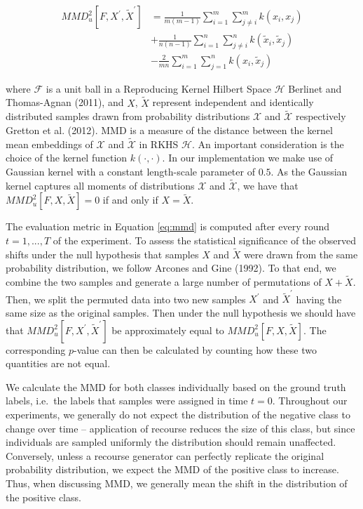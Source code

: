 \documentclass[conference,final,]{IEEEtran}
\begin{document}
\begin{equation}
\begin{aligned}
MMD^2_u[F,{X}^\prime,\tilde{X}^\prime] &= \frac{1}{m(m-1)}\sum_{i=1}^m\sum_{j\neq i}^m k(x_i,x_j) \\ &+ \frac{1}{n(n-1)}\sum_{i=1}^n\sum_{j\neq i}^n k(\tilde{x}_i,\tilde{x}_j) \\ &- \frac{2}{mn}\sum_{i=1}^m\sum_{j=1}^n k(x_i,\tilde{x}_j) \label{eq:mmd}
\end{aligned}
\end{equation}

where \(\mathcal{F}\) is a unit ball in a Reproducing Kernel Hilbert Space \(\mathcal{H}\) Berlinet and Thomas-Agnan (2011), and \(X\), \(\tilde{X}\) represent independent and identically distributed samples drawn from probability distributions \(\mathcal{X}\) and \(\mathcal{\tilde{X}}\) respectively Gretton et al. (2012). MMD is a measure of the distance between the kernel mean embeddings of \(\mathcal{X}\) and \(\mathcal{\tilde{X}}\) in RKHS \(\mathcal{H}\). An important consideration is the choice of the kernel function \(k(\cdot,\cdot)\). In our implementation we make use of Gaussian kernel with a constant length-scale parameter of \(0.5\). As the Gaussian kernel captures all moments of distributions \(\mathcal{X}\) and \(\mathcal{\tilde{X}}\), we have that \(MMD_u^2[F,X,\tilde{X}]=0\) if and only if \(X=\tilde{X}\).

The evaluation metric in Equation \eqref{eq:mmd} is computed after every round \(t=1,...,T\) of the experiment. To assess the statistical significance of the observed shifts under the null hypothesis that samples \(X\) and \(\tilde{X}\) were drawn from the same probability distribution, we follow Arcones and Gine (1992). To that end, we combine the two samples and generate a large number of permutations of \(X + \tilde{X}\). Then, we split the permuted data into two new samples \(X^\prime\) and \(\tilde{X}^\prime\) having the same size as the original samples. Then under the null hypothesis we should have that \(MMD_u^2[F,X^\prime,\tilde{X}^\prime]\) be approximately equal to \(MMD_u^2[F,X,\tilde{X}]\). The corresponding \(p\)-value can then be calculated by counting how these two quantities are not equal.

We calculate the MMD for both classes individually based on the ground truth labels, i.e.~the labels that samples were assigned in time \(t=0\). Throughout our experiments, we generally do not expect the distribution of the negative class to change over time -- application of recourse reduces the size of this class, but since individuals are sampled uniformly the distribution should remain unaffected. Conversely, unless a recourse generator can perfectly replicate the original probability distribution, we expect the MMD of the positive class to increase. Thus, when discussing MMD, we generally mean the shift in the distribution of the positive class.
\end{document}
